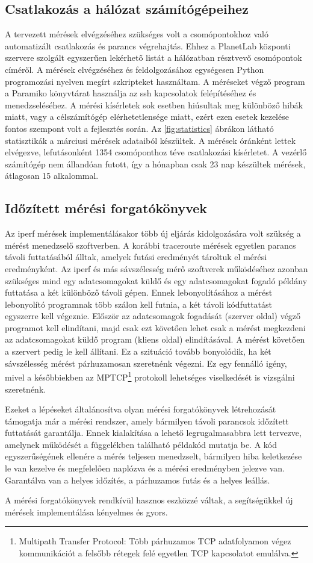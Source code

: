 \subsection{Csatlakozás a hálózat számítógépeihez}

A tervezett mérések elvégzéséhez szükséges volt a csomópontokhoz való automatizált csatlakozás és parancs végrehajtás. Ehhez a PlanetLab központi szervere szolgált egyszerűen lekérhető listát a hálózatban résztvevő csomópontok címéről. A mérések elvégzéséhez és feldolgozásához egységesen Python programozási nyelven megírt szkripteket használtam. A méréseket végző 
program a Paramiko\cite{paramiko} könyvtárat használja az ssh kapcsolatok felépítéséhez és menedzseléséhez. A mérési kísérletek sok esetben hiúsultak meg különböző hibák miatt, vagy a célszámítógép elérhetetlensége miatt, ezért ezen esetek kezelése fontos szempont volt a fejlesztés során. Az \ref{fig:statistics} ábrákon látható statisztikák a márciusi mérések adataiból készültek. A mérések óránként lettek elvégezve, lefutásonként 1354 csomóponthoz téve csatlakozási kísérletet. A vezérlő számítógép nem állandóan futott, így a hónapban csak 23 nap készültek mérések, átlagosan 15 alkalommal.

\subsection{Időzített mérési forgatókönyvek}
Az iperf mérések implementálásakor több új eljárás kidolgozására volt szükség a mérést menedzselő szoftverben. A korábbi traceroute mérések egyetlen parancs távoli futtatásából álltak, amelyek futási eredményét tároltuk el mérési eredményként. Az iperf és más sávszélesség mérő szoftverek működéséhez azonban szükséges mind egy adatcsomagokat küldő és egy adatcsomagokat fogadó példány futtatása a két különböző távoli gépen. Ennek lebonyolításához a mérést lebonyolító programnak több szálon kell futnia, a két távoli kódfuttatást egyszerre kell végeznie. Először az adatcsomagok fogadását (szerver oldal) végző programot kell elindítani, majd csak ezt követően lehet csak a mérést megkezdeni az adatcsomagokat küldő program (kliens oldal) elindításával. A mérést követően a szervert pedig le kell állítani. Ez a szituáció tovább bonyolódik, ha két sávszélesség mérést párhuzamosan szeretnénk végezni. Ez egy fennálló igény, mivel a későbbiekben az MPTCP\footnote{Multipath Transfer Protocol: Több párhuzamos TCP adatfolyamon végez kommunikációt a felsőbb rétegek felé egyetlen TCP kapcsolatot emulálva.} protokoll lehetséges viselkedését is vizsgálni szeretnénk.

Ezeket a lépéseket általánosítva olyan mérési forgatókönyvek létrehozását támogatja már a mérési rendszer, amely bármilyen távoli parancsok időzített futtatását garantálja. Ennek kialakítása a lehető legrugalmasabbra lett tervezve, amelynek működését a függelékben található példakód mutatja be. A kód egyszerűségének ellenére a mérés teljesen menedzselt, bármilyen hiba keletkezése le van kezelve és megfelelően naplózva és a mérési eredményben jelezve van. Garantálva van a helyes időzítés, a párhuzamos futás és a helyes leállás.

A mérési forgatókönyvek rendkívül hasznos eszközzé váltak, a segítségükkel új mérések implementálása kényelmes és gyors.